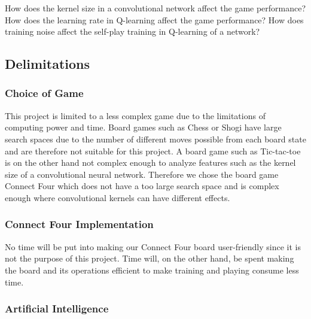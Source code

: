 \documentclass[titlepage]{article}
\begin{document}
\vskip 0.6cm

\begin{outline}
    \1 How does the kernel size in a convolutional network affect the game performance? 
    \1 How does the learning rate in Q-learning affect the game performance? 
    \1 How does training noise affect the self-play training in Q-learning of a network?
\end{outline}

\newpage

\subsection{Delimitations}

\vskip 0.2cm

\subsubsection{Choice of Game}

\vskip 0.2cm

This project is limited to a less complex game due to the limitations of computing power and time. Board games such as Chess or Shogi have large search spaces due to the number of different moves possible from each board state and are therefore not suitable for this project. A board game such as Tic-tac-toe is on the other hand not complex enough to analyze features such as the kernel size of a convolutional neural network. Therefore we chose the board game Connect Four which does not have a too large search space and is complex enough where convolutional kernels can have different effects. 

\subsubsection{Connect Four Implementation}

\vskip 0.2cm

No time will be put into making our Connect Four board user-friendly since it is not the purpose of this project. Time will, on the other hand, be spent making the board and its operations efficient to make training and playing consume less time. 

\subsubsection{Artificial Intelligence}

\vskip 0.2cm
\end{document}
